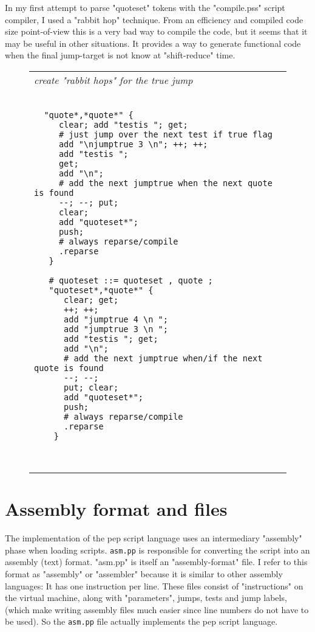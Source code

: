\documentclass[a4paper,12pt]{article}
\begin{document}
  In my first attempt to parse "quoteset" tokens with the "compile.pss"
  script compiler, I used a "rabbit hop" technique. From an efficiency
  and compiled code size point-of-view this is a very bad way to
  compile the code, but it seems that it may be useful in other
  situations. It provides a way to generate functional code when
  the final jump-target is not know at "shift-reduce" time.
 \begin{figure}
 \begin{tabular}{ l }
 \emph{ create "rabbit hops" for the true jump } \\ 
 \begin{lstlisting}[breaklines] 

  "quote*,*quote*" {
     clear; add "testis "; get;
     # just jump over the next test if true flag
     add "\njumptrue 3 \n"; ++; ++;
     add "testis ";
     get;
     add "\n";
     # add the next jumptrue when the next quote is found
     --; --; put;
     clear;
     add "quoteset*";
     push;
     # always reparse/compile
     .reparse
   }
     
   # quoteset ::= quoteset , quote ;
   "quoteset*,*quote*" {
      clear; get;
      ++; ++;
      add "jumptrue 4 \n ";
      add "jumptrue 3 \n ";
      add "testis "; get;
      add "\n";
      # add the next jumptrue when/if the next quote is found
      --; --;
      put; clear;
      add "quoteset*";
      push;
      # always reparse/compile
      .reparse
    }

  
 \end{lstlisting} 
 \end{tabular} 

 \end{figure}

\section{Assembly format and files}

  The implementation of the pep script language uses an intermediary "assembly"
  phase when loading scripts. \texttt{asm.pp} is responsible for converting
  the script into an assembly (text) format. "asm.pp" is itself an
  "assembly-format" file. I refer to this format as "assembly" or "assembler"
  because it is similar to other assembly languages: It has one instruction
  per line. These files consist of "instructions" on the virtual
  machine, along with "parameters", jumps, tests and jump labels, (which make
  writing assembly files much easier since line numbers do not have
  to be used). So the \texttt{asm.pp} file actually implements the pep script language.
\end{document}
